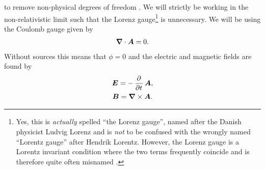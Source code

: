         to remove non-physical degrees of freedom \cite{modern-qm}.
        We will strictly be working in the non-relativistic limit such that the
        Lorenz gauge\footnote{%
            Yes, this is \emph{actually} spelled ``the Lorenz gauge'', named
            after the Danish physicist Ludvig Lorenz and is \emph{not} to be
            confused with the wrongly named ``Lorentz gauge'' after Hendrik
            Lorentz.
            However, the Lorenz gauge is a Lorentz invariant condition where the
            two terms frequently coincide and is therefore quite often misnamed
            \cite{wiki:lorenz}.
        } is unnecessary.
        We will be using the Coulomb gauge given by
        \begin{align}
            \boldsymbol{\nabla}\cdot\boldsymbol{A} = 0.
        \end{align}
        Without sources this means that $\phi = 0$ and the electric and magnetic
        fields are found by
        \begin{gather}
            \vfg{E} = -\dpd{}{t}\vfg{A}, \\
            \vfg{B} = \vfg{\nabla}\times \vfg{A}.
        \end{gather}

